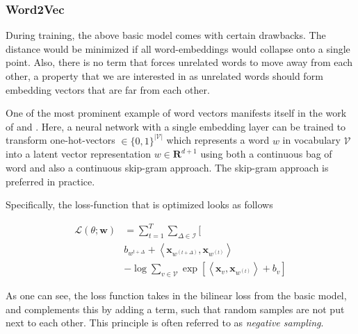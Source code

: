 \documentclass[a4paper,12pt,twoside,openright]{report}
\begin{document}


\subsubsection{Word2Vec}


During training, the above basic model comes with certain drawbacks. The distance would be minimized if all word-embeddings would collapse onto a single point. 
Also, there is no term that forces unrelated words to move away from each other, a property that we are interested in as unrelated words should form embedding vectors that are far from each other.

One of the most prominent example of word vectors manifests itself in the work of \cite{mikolov13} and \cite{mikolov13b}.
Here, a neural network with a single embedding layer can be trained to transform one-hot-vectors $\in \{ 0, 1 \}^{| \mathcal{V} |}$ which represents a word $w$ in vocabulary $\mathcal{V}$
into a latent vector representation $w \in \mathbf{R}^{d + 1}$ using both a continuous bag of word and also a continuous skip-gram approach.
The skip-gram approach is preferred in practice.

Specifically, the loss-function that is optimized looks as follows

\begin{align} 
\mathcal{L}(\theta ; \mathbf{w}) & =\sum_{t=1}^{T} \sum_{\Delta \in \mathcal{I}} [\\ 
& b_{w^{t+\Delta}} +\left\langle \mathbf{x}_{w^{(t+\Delta)}}, \mathbf{x}_{w^{(t)}} \right\rangle \\
& -\log \sum_{v \in \mathcal{V}} \exp \left[\left\langle\mathbf{x}_{v}, \mathbf{x}_{w^{(t)}}\right\rangle+b_{v} \right] 
\end{align}

As one can see, the loss function takes in the bilinear loss from the basic model, and complements this by adding a term, such that random samples are not put next to each other.
This principle is often referred to as \textit{negative sampling}.
\end{document}
